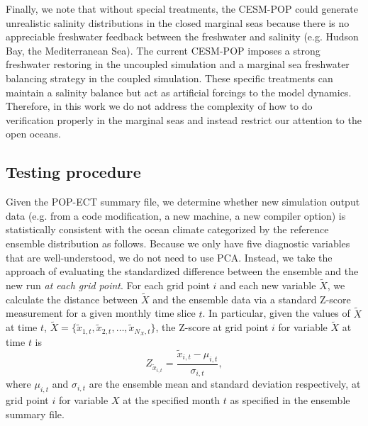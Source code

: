 \documentclass[gmd, manuscript]{copernicus}
\begin{document}
Finally, we note that without special treatments, the CESM-POP could generate unrealistic salinity distributions in the closed marginal seas because there is no appreciable freshwater feedback between the freshwater and salinity (e.g. Hudson Bay, the Mediterranean Sea).  The current CESM-POP imposes a strong freshwater restoring in the uncoupled simulation and a marginal sea freshwater balancing strategy in the coupled simulation.  These specific treatments can maintain a salinity balance but act as artificial forcings to the model dynamics.  Therefore, in this work we do not address the complexity of how to do verification properly in the marginal seas and instead restrict our attention to the open oceans.

\subsection{Testing procedure}

Given the POP-ECT summary file, we determine whether new simulation output data (e.g. from a code modification, a new machine, a new compiler option) is statistically consistent with the ocean climate categorized by the reference ensemble distribution as follows.  Because we only have five diagnostic variables that are well-understood, we do not need to use PCA. %
Instead,  we take the approach of evaluating the standardized difference between the ensemble and the new run \textit{at each grid point}. For each grid point $i$ and each new variable $\tilde{{X}}$, we calculate the distance between $\tilde{{X}}$ and the ensemble data via a standard Z-score measurement for a given monthly time slice $t$.
In particular, given the values of  $\tilde{{X}}$ at time $t$, $\tilde{{X}} = \{ \tilde{x}_{1,t}, \tilde{x}_{2,t}, \dots, \tilde{x}_{N_X,t}\}$, the Z-score at grid point $i$ for variable $\tilde{{X}}$ at time $t$ is
\begin{equation*}
Z_{\tilde{x}_{i,t}}=  \frac{\tilde{x}_{i,t} -\mu_{i,t}}{\sigma_{i,t}},
\end{equation*}
where $\mu_{i,t}$ and $\sigma_{i,t}$ are the ensemble mean and standard deviation respectively, at grid point $i$ for variable $X$ at the specified month $t$ as specified in the ensemble summary file.
\end{document}
